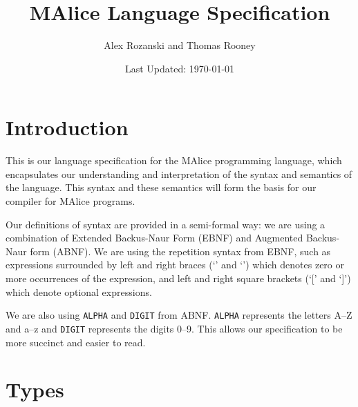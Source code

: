 \documentclass[a4wide, 11pt]{article}
\begin{document}
\title{MAlice Language Specification}

\author{Alex Rozanski and Thomas Rooney}

\date{Last Updated: \today}         %

\maketitle            %

\section{Introduction}

This is our language specification for the MAlice programming language, which encapsulates our understanding and interpretation of the syntax and semantics of the language. This syntax and these semantics will form the basis for our compiler for MAlice programs.

Our definitions of syntax are provided in a semi-formal way: we are using a combination of Extended Backus-Naur Form (EBNF) and Augmented Backus-Naur form (ABNF). We are using the repetition syntax from EBNF, such as expressions surrounded by left and right braces (`{' and `}') which denotes zero or more occurrences of the expression, and left and right square brackets (`[' and `]') which denote optional expressions.

We are also using \texttt{ALPHA} and \texttt{DIGIT} from ABNF. \texttt{ALPHA} represents the letters A--Z and a--z and \texttt{DIGIT} represents the digits 0--9. This allows our specification to be more succinct and easier to read.




\section{Types}
\end{document}
